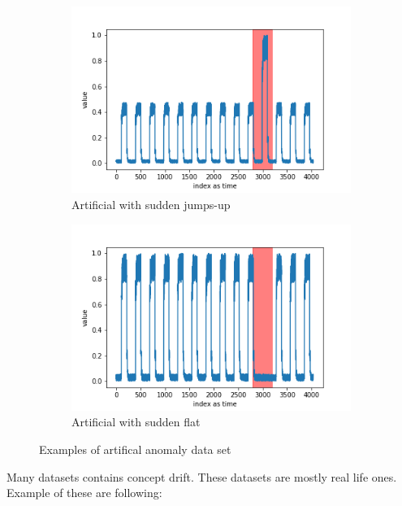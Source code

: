 \documentclass[12pt]{article}
\begin{document}
\begin{figure}[H]
  \begin{subfigure}[t]{.5\textwidth}
    \centering
    \includegraphics[width=\linewidth]{images/dataAnomalies/artificial/art_daily_jumpsup.png}
    \caption{Artificial with sudden jumps-up}
  \end{subfigure}
  \hfill
  \begin{subfigure}[t]{.5	\textwidth}
    \centering
    \includegraphics[width=\linewidth]{images/dataAnomalies/artificial/art_daily_nojump.png}
    \caption{Artificial with sudden flat}
  \end{subfigure}
  \caption{Examples of artifical anomaly data set}
  \label{artificialDataPlots}
\end{figure}

Many datasets contains concept drift. These datasets are mostly real life ones. Example of these are following:
\end{document}

